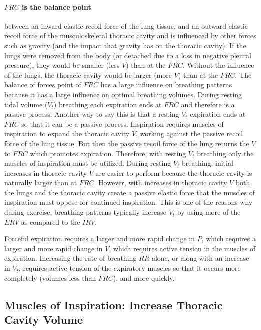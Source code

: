 \paragraph{$FRC$ is the balance point} between an inward elastic recoil force of the lung tissue, and an outward elastic recoil force of the musculoskeletal thoracic cavity and is influenced by other forces such as gravity (and the impact that gravity has on the thoracic cavity). If the lungs were removed from the body (or detached due to a loss in negative pleural pressure), they would be smaller (less $V$) than at the $FRC$. Without the influence of the lungs, the thoracic cavity would be larger (more $V$) than at the $FRC$. 
The balance of forces point of $FRC$ has a large influence on breathing patterns because it has a large influence on optimal breathing volumes. During resting tidal volume ($V_t$) breathing each expiration ends at $FRC$ and therefore is a passive process. Another way to say this is that a resting $V_t$ expiration ends at $FRC$ so that it can be a passive process. Inspiration requires muscles of inspiration to expand the thoracic cavity $V$, working against the passive recoil force of the lung tissue. But then the passive recoil force of the lung returns the $V$ to $FRC$ which promotes expiration. Therefore, with resting $V_t$ breathing only the muscles of inspiration must be utilized. 
During resting $V_t$ breathing, initial increases in thoracic cavity $V$ are easier to perform because the thoracic cavity is naturally larger than at $FRC$. However, with increases in thoracic cavity $V$ both the lungs and the thoracic cavity create a passive elastic force that the muscles of inspiration must oppose for continued inspiration. This is one of the reasons why during exercise, breathing patterns typically increase $V_t$ by using more of the $ERV$ as compared to the $IRV$.

Forceful expiration requires a larger and more rapid change in $P$, which requires a larger and more rapid change in $V$, which requires active tension in the muscles of expiration. Increasing the rate of breathing $RR$ alone, or along with an increase in $V_t$, requires active tension of the expiratory muscles so that it occurs more completely (volumes less than $FRC$), and more quickly. 

\subsection{Muscles of Inspiration: Increase Thoracic Cavity Volume}

